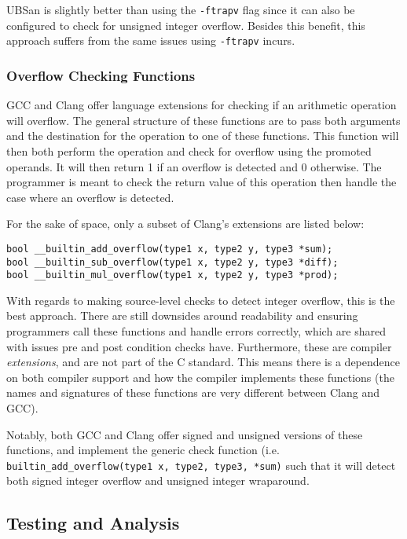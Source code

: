 UBSan is slightly better than using the \texttt{-ftrapv} flag since it can also be configured to check for unsigned integer overflow. Besides this benefit, this approach suffers from the same issues using \texttt{-ftrapv} incurs.

\subsubsection{Overflow Checking Functions}

GCC and Clang offer language extensions for checking if an arithmetic operation will overflow\cite{gcc-lang-ext}\cite{clang-lang-ext}. The general structure of these functions are to pass both arguments and the destination for the operation to one of these functions. This function will then both perform the operation and check for overflow using the promoted operands. It will then return 1 if an overflow is detected and 0 otherwise. The programmer is meant to check the return value of this operation then handle the case where an overflow is detected.

For the sake of space, only a subset of Clang's extensions are listed below:
\begin{tabbing}
\texttt{bool \_\_builtin\_add\_overflow(type1 x, type2 y, type3 *sum);}\\
\texttt{bool \_\_builtin\_sub\_overflow(type1 x, type2 y, type3 *diff);}\\
\texttt{bool \_\_builtin\_mul\_overflow(type1 x, type2 y, type3 *prod);}
\end{tabbing}

With regards to making source-level checks to detect integer overflow, this is the best approach. There are still downsides around readability and ensuring programmers call these functions and handle errors correctly, which are shared with issues pre and post condition checks have. Furthermore, these are compiler \textit{extensions}, and are not part of the C standard. This means there is a dependence on both compiler support and how the compiler implements these functions (the names and signatures of these functions are very different between Clang and GCC).

Notably, both GCC and Clang offer signed and unsigned versions of these functions, and implement the generic check function (i.e. \texttt{builtin\_add\_overflow(type1 x, type2, type3, *sum)} such that it will detect both signed integer overflow and unsigned integer wraparound.

\subsection{Testing and Analysis}

